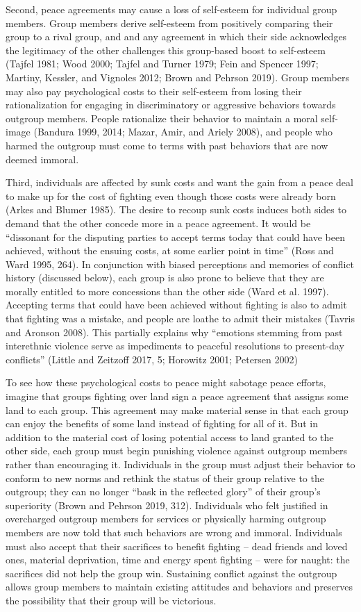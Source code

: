 \documentclass[11pt]{article}
\begin{document}
Second, peace agreements may cause a loss of self-esteem for individual
group members. Group members derive self-esteem from positively
comparing their group to a rival group, and and any agreement in which
their side acknowledges the legitimacy of the other challenges this
group-based boost to self-esteem (Tajfel 1981; Wood 2000; Tajfel and
Turner 1979; Fein and Spencer 1997; Martiny, Kessler, and Vignoles 2012;
Brown and Pehrson 2019). Group members may also pay psychological costs
to their self-esteem from losing their rationalization for engaging in
discriminatory or aggressive behaviors towards outgroup members. People
rationalize their behavior to maintain a moral self-image (Bandura 1999,
2014; Mazar, Amir, and Ariely 2008), and people who harmed the outgroup
must come to terms with past behaviors that are now deemed immoral.

Third, individuals are affected by sunk costs and want the gain from a
peace deal to make up for the cost of fighting even though those costs
were already born (Arkes and Blumer 1985). The desire to recoup sunk
costs induces both sides to demand that the other concede more in a
peace agreement. It would be ``dissonant for the disputing parties to
accept terms today that could have been achieved, without the ensuing
costs, at some earlier point in time'' (Ross and Ward 1995, 264). In
conjunction with biased perceptions and memories of conflict history
(discussed below), each group is also prone to believe that they are
morally entitled to more concessions than the other side (Ward et al.
1997). Accepting terms that could have been achieved without fighting is
also to admit that fighting was a mistake, and people are loathe to
admit their mistakes (Tavris and Aronson 2008). This partially explains
why ``emotions stemming from past interethnic violence serve as
impediments to peaceful resolutions to present-day conflicts'' (Little
and Zeitzoff 2017, 5; Horowitz 2001; Petersen 2002)

To see how these psychological costs to peace might sabotage peace
efforts, imagine that groups fighting over land sign a peace agreement
that assigns some land to each group. This agreement may make material
sense in that each group can enjoy the benefits of some land instead of
fighting for all of it. But in addition to the material cost of losing
potential access to land granted to the other side, each group must
begin punishing violence against outgroup members rather than
encouraging it. Individuals in the group must adjust their behavior to
conform to new norms and rethink the status of their group relative to
the outgroup; they can no longer ``bask in the reflected glory'' of
their group's superiority (Brown and Pehrson 2019, 312). Individuals who
felt justified in overcharged outgroup members for services or
physically harming outgroup members are now told that such behaviors are
wrong and immoral. Individuals must also accept that their sacrifices to
benefit fighting -- dead friends and loved ones, material deprivation,
time and energy spent fighting -- were for naught: the sacrifices did
not help the group win. Sustaining conflict against the outgroup allows
group members to maintain existing attitudes and behaviors and preserves
the possibility that their group will be victorious.
\end{document}
